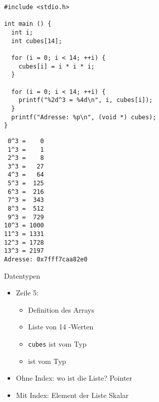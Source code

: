 
\begin{frame}[fragile]
%
%
\begin{codebox}[Beispiel]
\begin{verbatim}
#include <stdio.h>

int main () {
  int i;
  int cubes[14];
  
  for (i = 0; i < 14; ++i) {
    cubes[i] = i * i * i;
  }
  
  for (i = 0; i < 14; ++i) {
    printf("%2d^3 = %4d\n", i, cubes[i]);
  }
  printf("Adresse: %p\n", (void *) cubes);
}
\end{verbatim}
\end{codebox}%
%
%
\begin{cmdbox}[Ausgabe]
\begin{verbatim}
 0^3 =    0
 1^3 =    1
 2^3 =    8
 3^3 =   27
 4^3 =   64
 5^3 =  125
 6^3 =  216
 7^3 =  343
 8^3 =  512
 9^3 =  729
10^3 = 1000
11^3 = 1331
12^3 = 1728
13^3 = 2197
Adresse: 0x7fff7caa82e0
\end{verbatim}
\end{cmdbox}
%
\end{frame}


\begin{frame}{Datentypen}
%
\begin{itemize}
\item Zeile 5: 
	\begin{itemize}
	\item Definition des Arrays
	\item Liste von 14 -Werten
	\item \texttt{cubes} ist vom Typ 
	\item {} ist vom Typ 
	\end{itemize}
\item[\Thus] Ohne Index: wo ist die Liste? \thus Pointer
\item[\Thus] Mit Index: Element der Liste \thus Skalar
\end{itemize}
%
\end{frame}


